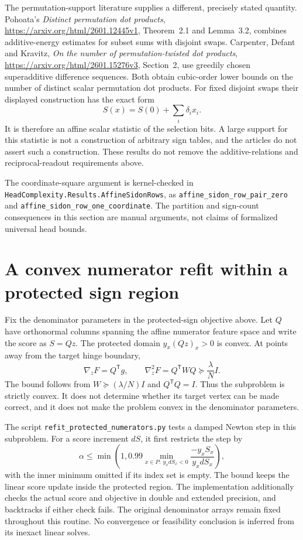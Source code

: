 \documentclass[11pt]{article}
\begin{document}
The permutation-support literature supplies a different, precisely stated
quantity. Pohoata's \emph{Distinct permutation dot products},
\url{https://arxiv.org/html/2601.12445v1}, Theorem~2.1 and Lemma~3.2,
combines additive-energy estimates for subset sums with disjoint swaps.
Carpenter, Defant and Kravitz,
\emph{On the number of permutation-twisted dot products},
\url{https://arxiv.org/html/2601.15276v3}, Section~2, use greedily chosen
superadditive difference sequences. Both obtain cubic-order lower bounds
on the number of distinct scalar permutation dot products. For fixed
disjoint swaps their displayed construction has the exact form
\[
 S(x)=S(0)+\sum_i\delta_i x_i.
\]
It is therefore an affine scalar statistic of the selection bits. A large
support for this statistic is not a construction of arbitrary sign tables,
and the articles do not assert such a construction. These results do not
remove the additive-relations and reciprocal-readout requirements above.

The coordinate-square argument is kernel-checked in
\texttt{HeadComplexity.Results.AffineSidonRows}, as
\texttt{affine\_sidon\_row\_pair\_zero} and
\texttt{affine\_sidon\_row\_one\_coordinate}.
The partition and sign-count consequences in this section are manual
arguments, not claims of formalized universal head bounds.


\section{A convex numerator refit within a protected sign region}

Fix the denominator parameters in the protected-sign objective above.
Let $Q$ have orthonormal columns spanning the affine numerator feature
space and write the score as $S=Qz$. The protected domain
$y_x(Qz)_x>0$ is convex. At points away from the target hinge boundary,
\[
 \nabla_z F=Q^{\mathsf T}g,\qquad
 \nabla_z^2F=Q^{\mathsf T}WQ
       \succeq\frac\lambda N I.
\]
The bound follows from $W\succeq(\lambda/N)I$ and $Q^{\mathsf T}Q=I$.
Thus the subproblem is strictly convex. It does not determine whether
its target vertex can be made correct, and it does not make the problem
convex in the denominator parameters.

The script \texttt{refit\_protected\_numerators.py} tests a damped
Newton step in this subproblem. For a score increment $dS$, it first
restricts the step by
\[
 \alpha\le\min\left(1,
 0.99\min_{x\in P:\ y_xdS_x<0}
             \frac{-y_xS_x}{y_xdS_x}\right),
\]
with the inner minimum omitted if its index set is empty.
The bound keeps the linear score update inside the protected region.
The implementation additionally checks the actual score and objective
in double and extended precision, and backtracks if either check fails.
The original denominator arrays remain fixed throughout this routine.
No convergence or feasibility conclusion is inferred from its inexact
linear solves.
\end{document}
